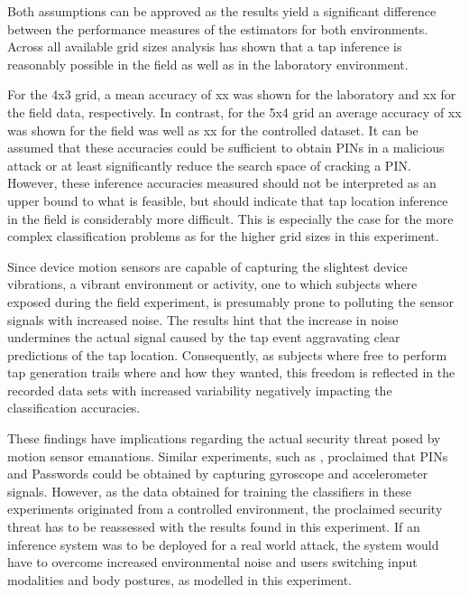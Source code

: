 Both assumptions can be approved as the results yield a significant difference between the performance measures of the estimators for both environments. Across all available grid sizes analysis has shown that a tap inference is reasonably possible in the field as well as in the laboratory environment. 

For the 4x3 grid, a mean accuracy of xx was shown for the laboratory and xx for the field data, respectively. In contrast, for the 5x4 grid an average accuracy of xx was shown for the field was well as xx for the controlled dataset. It can be assumed that these accuracies could be sufficient to obtain PINs in a malicious attack or at least significantly reduce the search space of cracking a PIN. However, these inference accuracies measured should not be interpreted as an upper bound to what is feasible, but should indicate that tap location inference in the field is considerably more difficult. This is especially the case for the more complex classification problems as for the higher grid sizes in this experiment.



Since device motion sensors are capable of capturing the slightest device vibrations, a vibrant environment or activity, one to which subjects where exposed during the field experiment, is presumably prone to polluting the sensor signals with increased noise. The results hint that the increase in noise undermines the actual signal caused by the tap event aggravating clear predictions of the tap location. Consequently, as subjects where free to perform tap generation trails where and how they wanted, this freedom is reflected in the recorded data sets with increased variability negatively impacting the classification accuracies.

These findings have implications regarding the actual security threat posed by motion sensor emanations. Similar experiments, such as \cite{Tapprints, Accessory}, proclaimed that PINs and Passwords could be obtained by capturing gyroscope and accelerometer signals. However, as the data obtained for training the classifiers in these experiments originated from a controlled environment, the proclaimed security threat has to be reassessed with the results found in this experiment. If an inference system was to be deployed for a real world attack, the system would have to overcome increased environmental noise and users switching input modalities and body postures, as modelled in this experiment. \\

